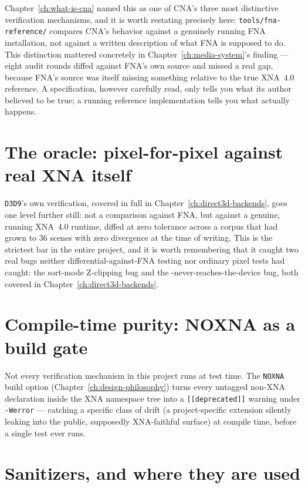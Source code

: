 Chapter~\ref{ch:what-is-cna} named this as one of CNA's three most distinctive verification
mechanisms, and it is worth restating precisely here: \texttt{tools/fna-reference/} compares
CNA's behavior against a genuinely running FNA installation, not against a written
description of what FNA is supposed to do. This distinction mattered concretely in
Chapter~\ref{ch:media-system}'s  finding --- eight audit rounds diffed against
FNA's own source and missed a real gap, because FNA's source was itself missing something
relative to the true XNA~4.0 reference. A specification, however carefully read, only tells
you what its author believed to be true; a running reference implementation tells you what
actually happens.

\section{The oracle: pixel-for-pixel against real XNA itself}

\texttt{D3D9}'s own verification, covered in full in Chapter~\ref{ch:direct3d-backends}, goes
one level further still: not a comparison against FNA, but against a genuine, running XNA~4.0
runtime, diffed at zero tolerance across a corpus that had grown to 36 scenes with zero
divergence at the time of writing. This is the strictest bar in the entire project, and it is
worth remembering that it caught two real bugs neither differential-against-FNA testing nor
ordinary pixel tests had caught: the sort-mode Z-clipping bug and the
-never-reaches-the-device bug, both covered in
Chapter~\ref{ch:direct3d-backends}.

\section{Compile-time purity: NOXNA as a build gate}

Not every verification mechanism in this project runs at test time. The \texttt{NOXNA} build
option (Chapter~\ref{ch:design-philosophy}) turns every untagged non-XNA declaration inside
the XNA namespace tree into a \texttt{[[deprecated]]} warning under \texttt{-Werror} ---
catching a specific class of drift (a project-specific extension silently leaking into the
public, supposedly XNA-faithful surface) at compile time, before a single test ever runs.

\section{Sanitizers, and where they are used}


